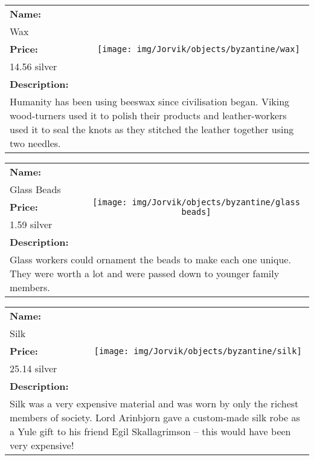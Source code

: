 \begin{table}[ht!]
	\centering
	\begin{tabular}{ p{3cm} c }\toprule
		\textbf{Name:} & \multirow{5}{*}{\texttt{[image: img/Jorvik/objects/byzantine/wax]}}\\
		Wax & \\ 
		\textbf{Price:} & \\
		14.56 silver & \\ 
		\textbf{Description:} & \\
		\multicolumn{2}{p{12cm}}{Humanity has been using beeswax since civilisation began. Viking wood-turners used it to polish their products and leather-workers used it to seal the knots as they stitched the leather together using two needles.}\\
		\bottomrule
	\end{tabular}
\end{table}

\begin{table}[ht!]
	\centering
	\begin{tabular}{ p{3cm} c }\toprule
		\textbf{Name:} & \multirow{5}{*}{\texttt{[image: img/Jorvik/objects/byzantine/glass beads]}}\\
		Glass Beads & \\ 
		\textbf{Price:} & \\
		1.59 silver & \\ 
		\textbf{Description:} & \\
		\multicolumn{2}{p{12cm}}{Glass workers could ornament the beads to make each one unique. They were worth a lot and were passed down to younger family members.}\\
		\bottomrule
	\end{tabular}
\end{table}

\begin{table}[ht!]
	\centering
	\begin{tabular}{ p{3cm} c }\toprule
		\textbf{Name:} & \multirow{5}{*}{\texttt{[image: img/Jorvik/objects/byzantine/silk]}}\\
		Silk & \\ 
		\textbf{Price:} & \\
		25.14 silver & \\ 
		\textbf{Description:} & \\
		\multicolumn{2}{p{12cm}}{Silk was a very expensive material and was worn by only the richest members of society. Lord Arinbjorn gave a custom-made silk robe as a Yule gift to his friend Egil Skallagrimson – this would have been very expensive!}\\
		\bottomrule
	\end{tabular}
\end{table}

